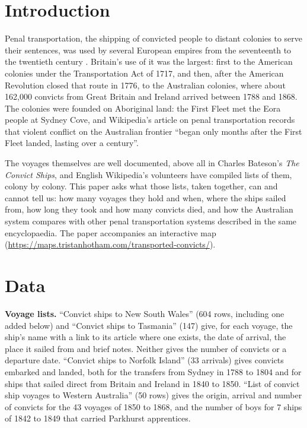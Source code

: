 \documentclass[11pt,a4paper]{article}
\begin{document}
\section{Introduction}
Penal transportation, the shipping of convicted people to distant colonies to serve their sentences, was used by several European empires from the seventeenth to the twentieth century \citep{wiki}. Britain's use of it was the largest: first to the American colonies under the Transportation Act of 1717, and then, after the American Revolution closed that route in 1776, to the Australian colonies, where about 162,000 convicts from Great Britain and Ireland arrived between 1788 and 1868. The colonies were founded on Aboriginal land: the First Fleet met the Eora people at Sydney Cove, and Wikipedia's article on penal transportation records that violent conflict on the Australian frontier ``began only months after the First Fleet landed, lasting over a century''.

The voyages themselves are well documented, above all in Charles Bateson's \emph{The Convict Ships}, and English Wikipedia's volunteers have compiled lists of them, colony by colony. This paper asks what those lists, taken together, can and cannot tell us: how many voyages they hold and when, where the ships sailed from, how long they took and how many convicts died, and how the Australian system compares with other penal transportation systems described in the same encyclopaedia. The paper accompanies an interactive map (\url{https://maps.tristanhotham.com/transported-convicts/}).

\section{Data}
\textbf{Voyage lists.} ``Convict ships to New South Wales'' (604 rows, including one added below) and ``Convict ships to Tasmania'' (147) give, for each voyage, the ship's name with a link to its article where one exists, the date of arrival, the place it sailed from and brief notes. Neither gives the number of convicts or a departure date. ``Convict ships to Norfolk Island'' (33 arrivals) gives convicts embarked and landed, both for the transfers from Sydney in 1788 to 1804 and for ships that sailed direct from Britain and Ireland in 1840 to 1850. ``List of convict ship voyages to Western Australia'' (50 rows) gives the origin, arrival and number of convicts for the 43 voyages of 1850 to 1868, and the number of boys for 7 ships of 1842 to 1849 that carried Parkhurst apprentices.
\end{document}
